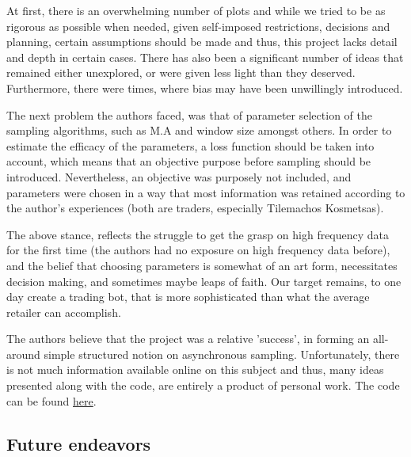 At first, there is an overwhelming number of plots and while we tried to be as rigorous as possible when needed, given self-imposed restrictions, decisions and planning, certain assumptions should be made and thus, this project lacks detail and depth in certain cases. There has also been a significant number of ideas that remained either unexplored, or were given less light than they deserved. Furthermore, there were times, where bias may have been unwillingly introduced. 

The next problem the authors faced, was that of parameter selection of the sampling algorithms, such as M.A and window size amongst others. In order to estimate the efficacy of the parameters, a loss function should be taken into account, which means that an objective purpose before sampling should be introduced. Nevertheless, an objective was purposely not included, and parameters were chosen in a way that most information was retained according to the author's experiences (both are traders, especially Tilemachos Kosmetsas).

The above stance, reflects the struggle to get the grasp on high frequency data for the first time (the authors had no exposure on high frequency data before), and the belief that choosing parameters is somewhat of an art form, necessitates decision making, and sometimes maybe leaps of faith. Our target remains, to one day create a trading bot, that is more sophisticated than what the average retailer can accomplish.

The authors believe that the project was a relative 'success', in forming an all-around simple structured notion on asynchronous sampling. Unfortunately, there is not much information available online on this subject and thus, many ideas presented along with the code, are entirely a product of personal work.
The code can be found \href{https://github.com/DonLeKouT/Thesis2}{here}.


\subsection{Future endeavors}


